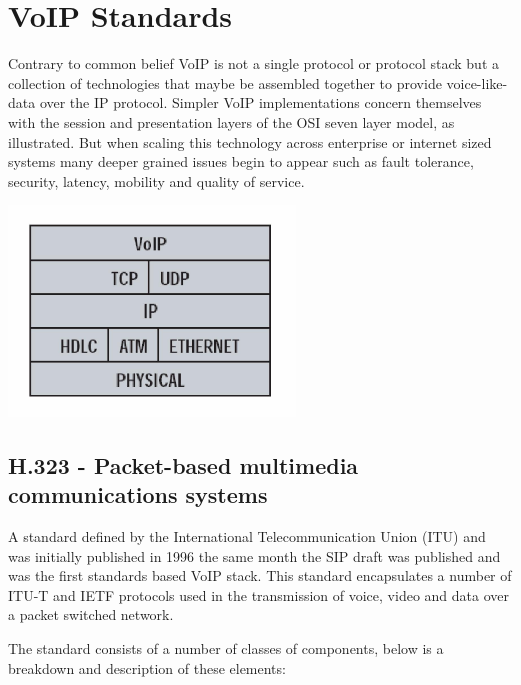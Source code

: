 \section{VoIP Standards}

Contrary to common belief VoIP is not a single protocol or protocol stack but a collection of technologies that maybe be assembled together to provide voice-like-data over the IP protocol. Simpler VoIP implementations concern themselves with the session and presentation layers of the OSI seven layer model, as illustrated. But when scaling this technology across enterprise or internet sized systems many deeper grained issues begin to appear such as fault tolerance, security, latency, mobility and quality of service.
\begin{center}
	\includegraphics[width=3in]{images/simple_voip_protocol.jpg}
\end{center}

\subsection{H.323 - Packet-based multimedia communications systems}
A standard defined by the International Telecommunication Union (ITU) and was initially published in 1996\cite{website:itu_h323} the same month the SIP draft was published and was the first standards based VoIP stack\cite{website:packetizer_h323}. This standard encapsulates a number of ITU-T and IETF protocols used in the transmission of voice, video and data over a packet switched network.

The standard consists of a number of classes of components, below is a breakdown and description of these elements:

